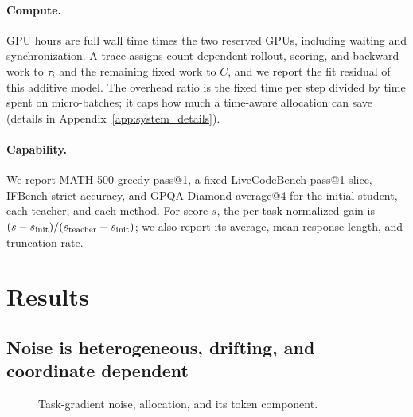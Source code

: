 \paragraph{Compute.}
GPU hours are full wall time times the two reserved GPUs, including waiting and
synchronization. A trace assigns count-dependent rollout, scoring, and backward
work to $\tau_i$ and the remaining fixed work to $C$, and we report the fit
residual of this additive model. The overhead ratio is the fixed time per step
divided by time spent on micro-batches; it caps how much a time-aware allocation
can save (details in Appendix~\ref{app:system_details}).

\paragraph{Capability.}
We report MATH-500 greedy pass@1, a fixed LiveCodeBench pass@1 slice, IFBench
strict accuracy, and GPQA-Diamond average@4 for the initial student, each
teacher, and each method. For score $s$, the per-task normalized gain is
$(s-s_{\rm init})/(s_{\rm teacher}-s_{\rm init})$; we also report its average,
mean response length, and truncation rate. 

\section{Results}
\label{sec:results}

\subsection{Noise is heterogeneous, drifting, and coordinate dependent}

\begin{figure}[H]
    \centering
    \caption{Task-gradient noise, allocation, and its token component.
    }
    \label{fig:allocation_dynamics}
\end{figure}

